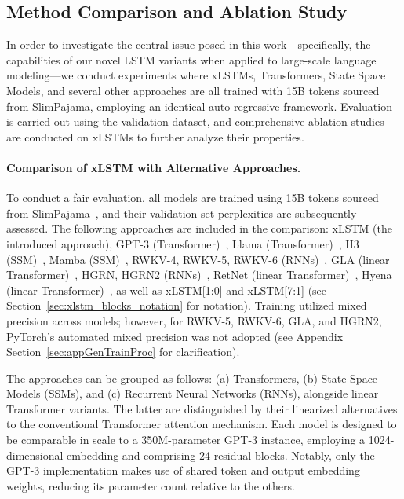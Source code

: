 \subsection{Method Comparison and Ablation Study}
\label{sec:ExpComparison}

In order to investigate the central issue posed in this work—specifically, the capabilities of our novel LSTM variants when applied to large-scale language modeling—we conduct experiments where xLSTMs, Transformers, State Space Models, and several other approaches are all trained with 15B tokens sourced from SlimPajama, employing an identical auto-regressive framework. Evaluation is carried out using the validation dataset, and comprehensive ablation studies are conducted on xLSTMs to further analyze their properties.

\paragraph{Comparison of xLSTM with Alternative Approaches.} To conduct a fair evaluation, all models are trained using 15B tokens sourced from SlimPajama~\citep{Soboleva:23}, and their validation set perplexities are subsequently assessed. The following approaches are included in the comparison: xLSTM (the introduced approach), GPT-3 (Transformer)~\citep{Brown:20short}, Llama (Transformer)~\citep{Touvron:23arxiv}, H3 (SSM)~\citep{Fu:23}, Mamba (SSM)~\citep{Gu:24arxiv}, RWKV-4, RWKV-5, RWKV-6 (RNNs)~\citep{Peng:23arxivshort, Peng:24arxivshort}, GLA (linear Transformer)~\citep{Yang:23arxiv}, HGRN, HGRN2 (RNNs)~\citep{Qin:23, Qin:24arxiv}, RetNet (linear Transformer)~\citep{Sun:23arxiv}, Hyena (linear Transformer)~\citep{Poli:23}, as well as xLSTM[1:0] and xLSTM[7:1] (see Section~\ref{sec:xlstm_blocks_notation} for notation). Training utilized mixed precision across models; however, for RWKV-5, RWKV-6, GLA, and HGRN2, PyTorch's automated mixed precision was not adopted (see Appendix Section~\ref{sec:appGenTrainProc} for clarification).

The approaches can be grouped as follows: (a) Transformers, (b) State Space Models (SSMs), and (c) Recurrent Neural Networks (RNNs), alongside linear Transformer variants. The latter are distinguished by their linearized alternatives to the conventional Transformer attention mechanism. Each model is designed to be comparable in scale to a 350M-parameter GPT-3 instance, employing a 1024-dimensional embedding and comprising 24 residual blocks. Notably, only the GPT-3 implementation makes use of shared token and output embedding weights, reducing its parameter count relative to the others.

